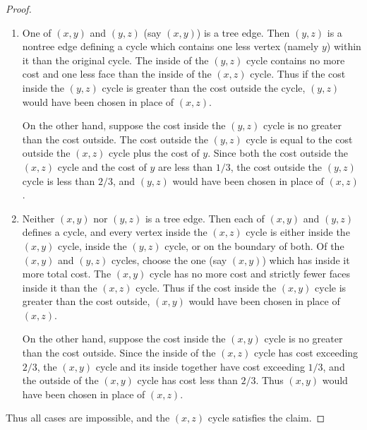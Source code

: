 \documentclass[12pt]{article}
\theoremstyle{remark}
\begin{document}
\begin{proof}
\begin{enumerate}[label=\arabic*)]
\begin{enumerate}[label=\alph*)]
  \item One of $(x, y)$ and $(y, z)$ (say $(x, y)$) is a tree edge. Then $(y, z)$ is
  a nontree edge defining a cycle which contains one less vertex (namely $y$) within
  it than the original cycle. The inside of the $(y, z)$ cycle contains no more cost
  and one less face than the inside of the $(x, z)$ cycle. Thus if the cost inside the
  $(y, z)$ cycle is greater than the cost outside the cycle, $(y, z)$ would have been
  chosen in place of $(x, z)$.

  On the other hand, suppose the cost inside the $(y, z)$ cycle is no greater than
  the cost outside. The cost outside the $(y, z)$ cycle is equal to the cost outside
  the $(x, z)$ cycle plus the cost of $y$. Since both the cost outside the $(x, z)$
  cycle and the cost of $y$ are less than $1/3$, the cost outside the $(y, z)$ cycle
  is less than $2/3$, and $(y, z)$ would have been chosen in place of $(x, z)$.

  \item Neither $(x, y)$ nor $(y, z)$ is a tree edge. Then each of $(x, y)$ and
  $(y, z)$ defines a cycle, and every vertex inside the $(x, z)$ cycle is either
  inside the $(x, y)$ cycle, inside the $(y, z)$ cycle, or on the boundary of both.
  Of the $(x, y)$ and $(y, z)$ cycles, choose the one (say $(x, y)$) which has inside
  it more total cost. The $(x, y)$ cycle has no more cost and strictly fewer faces
  inside it than the $(x, z)$ cycle. Thus if the cost inside the $(x, y)$ cycle is
  greater than the cost outside, $(x, y)$ would have been chosen in place of $(x, z)$.

  On the other hand, suppose the cost inside the $(x, y)$ cycle is no greater than
  the cost outside. Since the inside of the $(x, z)$ cycle has cost exceeding $2/3$,
  the $(x, y)$ cycle and its inside together have cost exceeding $1/3$, and the
  outside of the $(x, y)$ cycle has cost less than $2/3$. Thus $(x, y)$ would have
  been chosen in place of $(x, z)$.
  \end{enumerate}
\end{enumerate}

Thus all cases are impossible, and the $(x, z)$ cycle satisfies the claim.
\end{proof}
\end{document}
